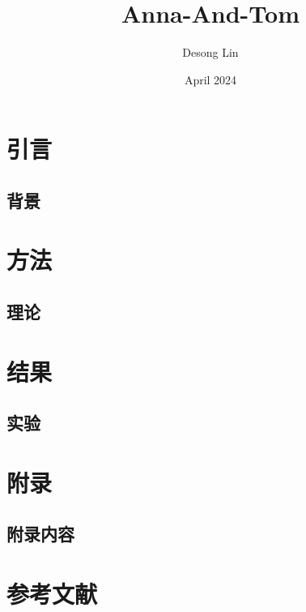 \documentclass[twoside]{book}
\title{\fontsize{18}{19}\selectfont Anna-And-Tom}
\author{Desong Lin}
\date{April 2024}
\begin{document}
\maketitle
\fontsize{13}{15}\selectfont
\tableofcontents %

\chapter{引言}
\section{背景}
\lipsum[1-2] %

\chapter{方法}
\section{理论}
\lipsum[3-4] %

\chapter{结果}
\section{实验}
\lipsum[5-6] %

\appendix
\chapter{附录}
\section{附录内容}
\lipsum[7-8] %

\backmatter
\chapter{参考文献}
\end{document}
